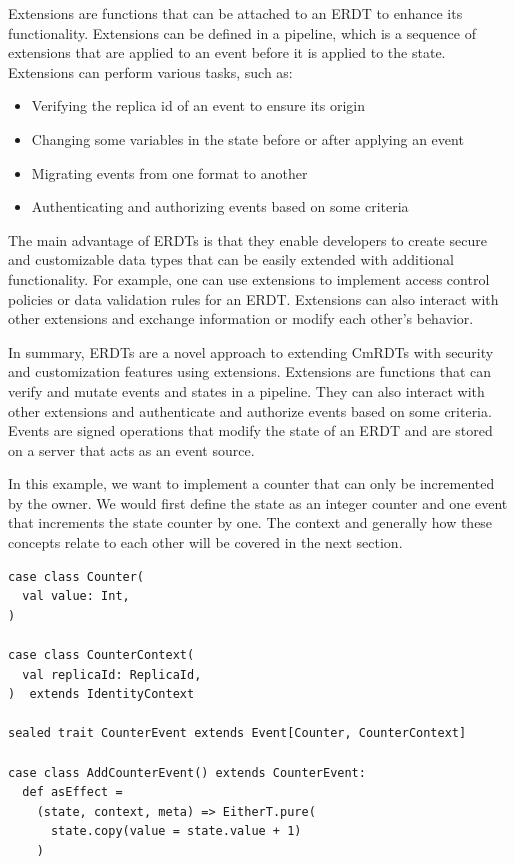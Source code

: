 \documentclass[
	english,
	ruledheaders=section,   %
	class=report,		    %
	thesis={type=bachelor}, %
	accentcolor=9c,			%
	custommargins=true,    %
	marginpar=false,        %
	parskip=half-,          %
	fontsize=11pt,          %
]{tudapub}
\begin{document}
Extensions are functions that can be attached to an ERDT to enhance its functionality. Extensions can be defined in a pipeline, which is a sequence of extensions that are applied to an event before it is applied to the state. Extensions can perform various tasks, such as:

\begin{itemize}
  \item Verifying the replica id of an event to ensure its origin
  \item Changing some variables in the state before or after applying an event
  \item Migrating events from one format to another
  \item Authenticating and authorizing events based on some criteria
\end{itemize}

The main advantage of ERDTs is that they enable developers to create secure and customizable data types that can be easily extended with additional functionality. For example, one can use extensions to implement access control policies or data validation rules for an ERDT. Extensions can also interact with other extensions and exchange information or modify each other’s behavior.

In summary, ERDTs are a novel approach to extending CmRDTs with security and customization features using extensions. Extensions are functions that can verify and mutate events and states in a pipeline. They can also interact with other extensions and authenticate and authorize events based on some criteria. Events are signed operations that modify the state of an ERDT and are stored on a server that acts as an event source. 


In this example, we want to implement a counter that can only be incremented by the owner. We would first define the state as an integer counter and one event that increments the state counter by one. The context and generally how these concepts relate to each other will be covered in the next section.

\begin{lstlisting}
case class Counter(
  val value: Int,
) 

case class CounterContext(
  val replicaId: ReplicaId,
)  extends IdentityContext

sealed trait CounterEvent extends Event[Counter, CounterContext]

case class AddCounterEvent() extends CounterEvent:
  def asEffect =
    (state, context, meta) => EitherT.pure(
      state.copy(value = state.value + 1)
    )

\end{lstlisting}
\end{document}
